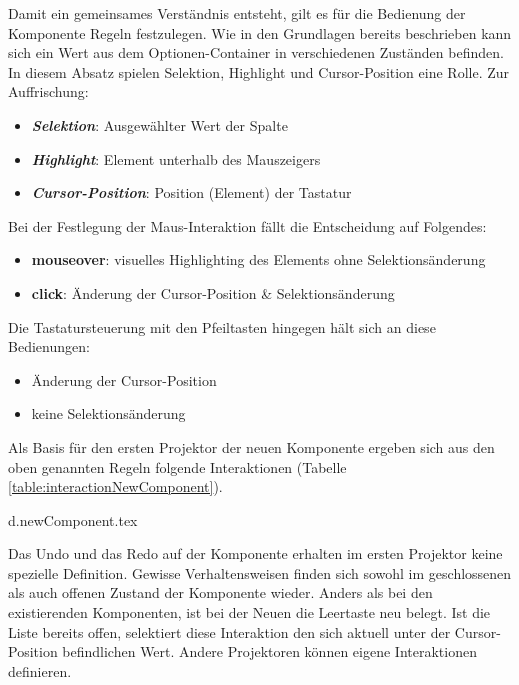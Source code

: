Damit ein gemeinsames Verständnis entsteht, gilt es für die Bedienung der Komponente Regeln festzulegen. 
Wie in den Grundlagen bereits beschrieben kann sich ein Wert aus dem Optionen-Container in verschiedenen Zuständen befinden. 
In diesem Absatz spielen Selektion, Highlight und Cursor-Position eine Rolle. 
Zur Auffrischung: 

\begin{itemize}
    \item \textbf{\emph{Selektion}}: Ausgewählter Wert der Spalte
    \item \textbf{\emph{Highlight}}: Element unterhalb des Mauszeigers
    \item \textbf{\emph{Cursor-Position}}: Position (Element) der Tastatur
\end{itemize}

\noindent
Bei der Festlegung der Maus-Interaktion fällt die Entscheidung auf Folgendes: 

\begin{itemize}
    \item \textbf{mouseover}: visuelles Highlighting des Elements ohne Selektionsänderung
    \item \textbf{click}: Änderung der Cursor-Position \& Selektionsänderung
\end{itemize}

\noindent
Die Tastatursteuerung mit den Pfeiltasten hingegen hält sich an diese Bedienungen: 

\begin{itemize}
    \item Änderung der Cursor-Position
    \item keine Selektionsänderung
\end{itemize}

\noindent
Als Basis für den ersten Projektor der neuen Komponente ergeben sich aus den oben genannten Regeln folgende Interaktionen (Tabelle \ref{table:interactionNewComponent}). 

{d.newComponent.tex}

Das Undo und das Redo auf der Komponente erhalten im ersten Projektor keine spezielle Definition. 
Gewisse Verhaltensweisen finden sich sowohl im geschlossenen als auch offenen Zustand der Komponente wieder. 
Anders als bei den existierenden Komponenten, ist bei der Neuen die Leertaste neu belegt. 
Ist die Liste bereits offen, selektiert diese Interaktion den sich aktuell unter der Cursor-Position befindlichen Wert. 
Andere Projektoren können eigene Interaktionen definieren. 


